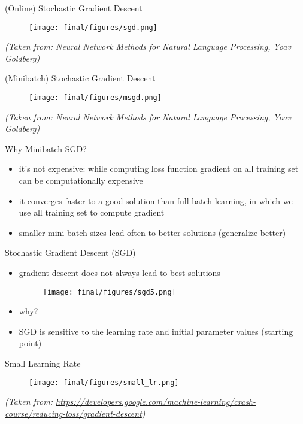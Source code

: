 \begin{frame}{(Online) Stochastic Gradient Descent}
\centering
\begin{figure}
    \texttt{[image: final/figures/sgd.png]}
\end{figure}
\vspace*{\fill}
\textit{\tiny{(Taken from: Neural Network Methods for Natural Language Processing, Yoav Goldberg)}}
\end{frame}
\begin{frame}{\Large{(Minibatch) Stochastic Gradient Descent}}
\centering
\begin{figure}
    \texttt{[image: final/figures/msgd.png]}
\end{figure}
\vspace*{\fill}
\textit{\tiny{(Taken from: Neural Network Methods for Natural Language Processing, Yoav Goldberg)}}
\end{frame}
\begin{frame}{Why Minibatch SGD?}
    \begin{itemize}
        \item<1-> it's not expensive: while computing loss function gradient on all training set can be computationally
expensive 
        \item<2-> it converges faster to a good solution than full-batch learning, in which we use all training set to compute gradient
        \item<3-> smaller mini-batch sizes lead often to better solutions (generalize better)
    \end{itemize}
\end{frame}
\begin{frame}{Stochastic Gradient Descent (SGD)}
    \begin{itemize}
        \item<1-> gradient descent does not always lead to best solutions
        \begin{figure}
            \texttt{[image: final/figures/sgd5.png]}
        \end{figure}
        \item<2-> why? 
        \item<3-> SGD is sensitive to the learning rate and initial parameter values (starting point)
    \end{itemize}
\end{frame}
\begin{frame}{Small Learning Rate}
         \begin{figure}
        \centering
         \texttt{[image: final/figures/small\_lr.png]}
        \end{figure}
\vspace*{\fill}
\textit{\tiny{(Taken from: 
\url{https://developers.google.com/machine-learning/crash-course/reducing-loss/gradient-descent})}}     
\end{frame}
